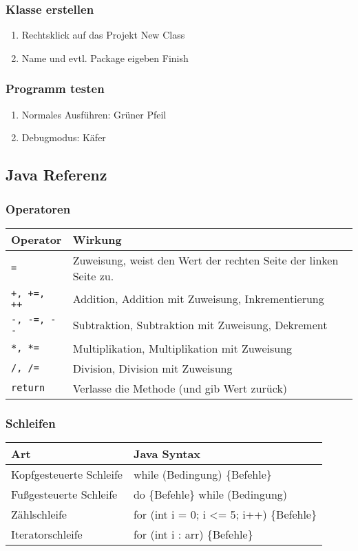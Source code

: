 		\subsubsection{Klasse erstellen}
		\begin{enumerate}
		\item Rechtsklick auf das Projekt \frqq New \frqq Class
		\item Name und evtl. Package eigeben \frqq Finish
		\end{enumerate}

		\subsubsection{Programm testen}
		\begin{enumerate}
		\item Normales Ausführen: Grüner Pfeil
		\item Debugmodus: Käfer
		\end{enumerate}

	\subsection{Java Referenz}
		\subsubsection{Operatoren}
		\begin{tabular}{ll}
		\textbf{Operator} & \textbf{Wirkung}\\
		\hline
		\lstinline$=$ & Zuweisung, weist den Wert der rechten Seite der linken Seite zu.\\
		\lstinline$+, +=, ++$ & Addition, Addition mit Zuweisung, Inkrementierung\\
		\lstinline$-, -=, --$ & Subtraktion, Subtraktion mit Zuweisung, Dekrement\\
		\lstinline$*, *=$ & Multiplikation, Multiplikation mit Zuweisung\\
		\lstinline$/, /=$ & Division, Division mit Zuweisung\\
		\lstinline$return$ & Verlasse die Methode (und gib Wert zurück)\\
		\end{tabular}

		\subsubsection{Schleifen}
		\begin{tabular}{ll}
		\textbf{Art} & \textbf{Java Syntax}\\
		\hline
		Kopfgesteuerte Schleife & while (Bedingung) \{Befehle\}\\
		Fußgesteuerte Schleife & do \{Befehle\} while (Bedingung)\\
		Zählschleife & for (int i = 0; i <= 5; i++) \{Befehle\}\\
		Iteratorschleife & for (int i : arr) \{Befehle\}\\
		
		\end{tabular}

